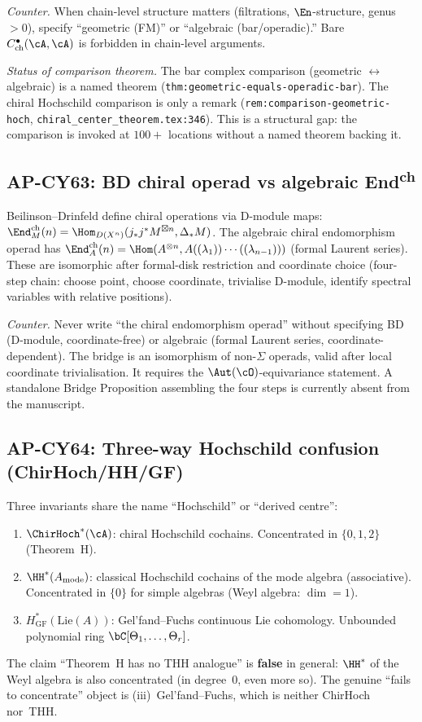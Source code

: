 \emph{Counter.}  When chain-level structure matters (filtrations,
$\En$-structure, genus $> 0$), specify ``geometric (FM)'' or
``algebraic (bar/operadic).''  Bare $C^\bullet_{\mathrm{ch}}(\cA,\cA)$
is forbidden in chain-level arguments.

\emph{Status of comparison theorem.}  The bar complex comparison
(geometric $\leftrightarrow$ algebraic) is a named theorem
(\texttt{thm:geometric-equals-operadic-bar}).  The chiral Hochschild
comparison is only a remark (\texttt{rem:comparison-geometric-hoch},
\texttt{chiral\_center\_theorem.tex:346}).  This is a structural gap:
the comparison is invoked at $100{+}$ locations without a named theorem
backing it.

\subsection{AP-CY63: BD chiral operad vs algebraic End\textsuperscript{ch}}

Beilinson--Drinfeld define chiral operations via D-module maps:
$\End^{\mathrm{ch}}_M(n) = \Hom_{D(X^n)}(j_* j^* M^{\boxtimes n},
\Delta_* M)$.  The algebraic chiral endomorphism operad has
$\End^{\mathrm{ch}}_A(n) = \Hom(A^{\otimes n},
A((\lambda_1))\cdots((\lambda_{n-1})))$ (formal Laurent series).
These are isomorphic after formal-disk restriction and coordinate
choice (four-step chain: choose point, choose coordinate, trivialise
D-module, identify spectral variables with relative positions).

\emph{Counter.}  Never write ``the chiral endomorphism operad''
without specifying BD (D-module, coordinate-free) or algebraic
(formal Laurent series, coordinate-dependent).
The bridge is an isomorphism of non-$\Sigma$ operads,
valid after local coordinate trivialisation.  It requires the
$\Aut(\cO)$-equivariance statement.  A standalone Bridge
Proposition assembling the four steps is currently absent from
the manuscript.

\subsection{AP-CY64: Three-way Hochschild confusion (ChirHoch/HH/GF)}

Three invariants share the name ``Hochschild'' or ``derived centre'':
\begin{enumerate}[label=(\roman*),nosep]
\item $\ChirHoch^*(\cA)$: chiral Hochschild cochains.  Concentrated
      in $\{0,1,2\}$ (Theorem~H).
\item $\HH^*(A_{\mathrm{mode}})$: classical Hochschild cochains of
      the mode algebra (associative).  Concentrated in $\{0\}$ for
      simple algebras (Weyl algebra: $\dim = 1$).
\item $H^*_{\mathrm{GF}}(\mathrm{Lie}(A))$: Gel'fand--Fuchs
      continuous Lie cohomology.  Unbounded polynomial ring
      $\bC[\Theta_1, \ldots, \Theta_r]$.
\end{enumerate}
The claim ``Theorem~H has no THH analogue'' is \textbf{false} in
general: $\HH^*$ of the Weyl algebra is also concentrated (in
degree~$0$, even more so).  The genuine ``fails to concentrate''
object is (iii)~Gel'fand--Fuchs, which is neither ChirHoch nor~THH.

